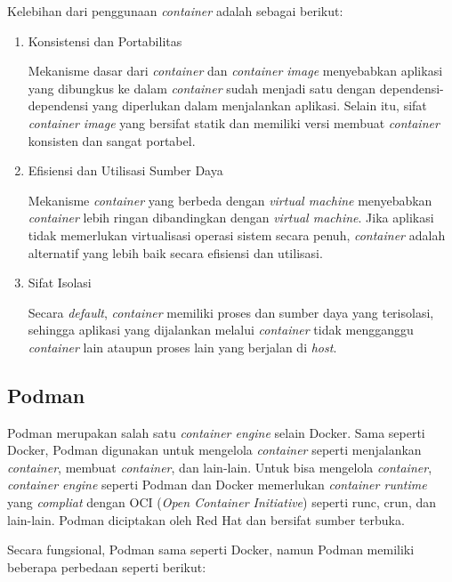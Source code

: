 Kelebihan dari penggunaan \emph{container} adalah sebagai berikut:

\begin{enumerate}

  \item Konsistensi dan Portabilitas

    Mekanisme dasar dari \emph{container} dan \emph{container image} menyebabkan aplikasi
    yang dibungkus ke dalam \emph{container} sudah menjadi satu dengan dependensi-dependensi
    yang diperlukan dalam menjalankan aplikasi. Selain itu, sifat \emph{container image} yang bersifat
    statik dan memiliki versi membuat \emph{container} konsisten dan sangat portabel.

  \item Efisiensi dan Utilisasi Sumber Daya

    Mekanisme \emph{container} yang berbeda dengan \emph{virtual machine} menyebabkan
    \emph{container} lebih ringan dibandingkan dengan \emph{virtual machine}. Jika aplikasi
    tidak memerlukan virtualisasi operasi sistem secara penuh, \emph{container} adalah alternatif
    yang lebih baik secara efisiensi dan utilisasi.

  \item Sifat Isolasi

    Secara \emph{default}, \emph{container} memiliki proses dan sumber daya yang terisolasi, sehingga
    aplikasi yang dijalankan melalui \emph{container} tidak mengganggu \emph{container} lain ataupun
    proses lain yang berjalan di \emph{host}.

\end{enumerate}

\subsection{Podman}
\label{sec:podman}

Podman merupakan salah satu \emph{container engine} selain Docker. Sama seperti Docker,
Podman digunakan untuk mengelola \emph{container} seperti menjalankan \emph{container},
membuat \emph{container}, dan lain-lain. Untuk bisa mengelola \emph{container},
\emph{container engine} seperti Podman dan Docker memerlukan \emph{container runtime} yang \emph{compliat}
dengan OCI (\emph{Open Container Initiative}) seperti runc, crun, dan lain-lain. Podman diciptakan oleh
Red Hat dan bersifat sumber terbuka.

Secara fungsional, Podman sama seperti Docker, namun Podman memiliki beberapa perbedaan seperti berikut:

